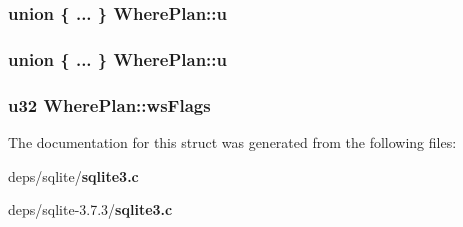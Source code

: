 \subsubsection{\setlength{\rightskip}{0pt plus 5cm}union \{ ... \}   \bf{Where\-Plan::u}}\label{structWherePlan_e8a9910323d988e1adea828a83d8620c}


\subsubsection{\setlength{\rightskip}{0pt plus 5cm}union \{ ... \}   \bf{Where\-Plan::u}}\label{structWherePlan_79d668c0409124cf0809a9983b662564}


\subsubsection{\setlength{\rightskip}{0pt plus 5cm}\bf{u32} \bf{Where\-Plan::ws\-Flags}}\label{structWherePlan_564a5cb31b4dd99f95798bccc6700344}




The documentation for this struct was generated from the following files:\begin{CompactItemize}
\item 
deps/sqlite/\bf{sqlite3.c}\item 
deps/sqlite-3.7.3/\bf{sqlite3.c}\end{CompactItemize}
